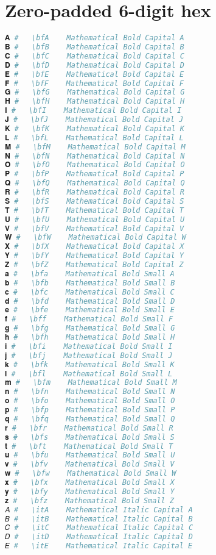 \section{Zero-padded 6-digit hex}
\begin{lstlisting}[language=Julia, style=julia]
𝐀 #   \bfA    Mathematical Bold Capital A
𝐁 #   \bfB    Mathematical Bold Capital B
𝐂 #   \bfC    Mathematical Bold Capital C
𝐃 #   \bfD    Mathematical Bold Capital D
𝐄 #   \bfE    Mathematical Bold Capital E
𝐅 #   \bfF    Mathematical Bold Capital F
𝐆 #   \bfG    Mathematical Bold Capital G
𝐇 #   \bfH    Mathematical Bold Capital H
𝐈 #   \bfI    Mathematical Bold Capital I
𝐉 #   \bfJ    Mathematical Bold Capital J
𝐊 #   \bfK    Mathematical Bold Capital K
𝐋 #   \bfL    Mathematical Bold Capital L
𝐌 #   \bfM    Mathematical Bold Capital M
𝐍 #   \bfN    Mathematical Bold Capital N
𝐎 #   \bfO    Mathematical Bold Capital O
𝐏 #   \bfP    Mathematical Bold Capital P
𝐐 #   \bfQ    Mathematical Bold Capital Q
𝐑 #   \bfR    Mathematical Bold Capital R
𝐒 #   \bfS    Mathematical Bold Capital S
𝐓 #   \bfT    Mathematical Bold Capital T
𝐔 #   \bfU    Mathematical Bold Capital U
𝐕 #   \bfV    Mathematical Bold Capital V
𝐖 #   \bfW    Mathematical Bold Capital W
𝐗 #   \bfX    Mathematical Bold Capital X
𝐘 #   \bfY    Mathematical Bold Capital Y
𝐙 #   \bfZ    Mathematical Bold Capital Z
𝐚 #   \bfa    Mathematical Bold Small A
𝐛 #   \bfb    Mathematical Bold Small B
𝐜 #   \bfc    Mathematical Bold Small C
𝐝 #   \bfd    Mathematical Bold Small D
𝐞 #   \bfe    Mathematical Bold Small E
𝐟 #   \bff    Mathematical Bold Small F
𝐠 #   \bfg    Mathematical Bold Small G
𝐡 #   \bfh    Mathematical Bold Small H
𝐢 #   \bfi    Mathematical Bold Small I
𝐣 #   \bfj    Mathematical Bold Small J
𝐤 #   \bfk    Mathematical Bold Small K
𝐥 #   \bfl    Mathematical Bold Small L
𝐦 #   \bfm    Mathematical Bold Small M
𝐧 #   \bfn    Mathematical Bold Small N
𝐨 #   \bfo    Mathematical Bold Small O
𝐩 #   \bfp    Mathematical Bold Small P
𝐪 #   \bfq    Mathematical Bold Small Q
𝐫 #   \bfr    Mathematical Bold Small R
𝐬 #   \bfs    Mathematical Bold Small S
𝐭 #   \bft    Mathematical Bold Small T
𝐮 #   \bfu    Mathematical Bold Small U
𝐯 #   \bfv    Mathematical Bold Small V
𝐰 #   \bfw    Mathematical Bold Small W
𝐱 #   \bfx    Mathematical Bold Small X
𝐲 #   \bfy    Mathematical Bold Small Y
𝐳 #   \bfz    Mathematical Bold Small Z
𝐴 #   \itA    Mathematical Italic Capital A
𝐵 #   \itB    Mathematical Italic Capital B
𝐶 #   \itC    Mathematical Italic Capital C
𝐷 #   \itD    Mathematical Italic Capital D
𝐸 #   \itE    Mathematical Italic Capital E

\end{lstlisting}
